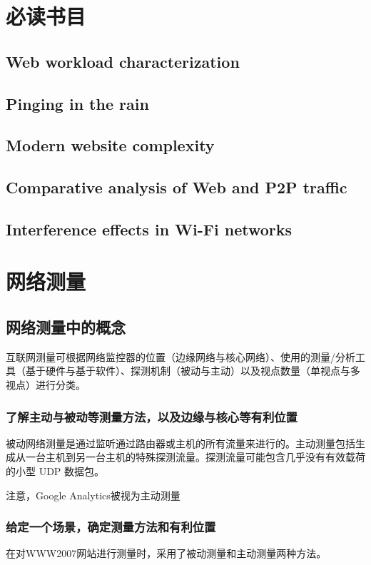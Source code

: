 \chapter*{必读书目}

\section{Web workload characterization}
\section{Pinging in the rain}
\section{Modern website complexity}
\section{Comparative analysis of Web and P2P traffic}
\section{Interference effects in Wi-Fi networks}


\chapter{网络测量}

\section{网络测量中的概念}

互联网测量可根据网络监控器的位置（边缘网络与核心网络）、使用的测量/分析工具（基于硬件与基于软件）、探测机制（被动与主动）以及视点数量（单视点与多视点）进行分类。

\subsection{了解主动与被动等测量方法，以及边缘与核心等有利位置}

被动网络测量是通过监听通过路由器或主机的所有流量来进行的。主动测量包括生成从一台主机到另一台主机的特殊探测流量。探测流量可能包含几乎没有有效载荷的小型 UDP 数据包。

注意，Google Analytics被视为主动测量

\subsection{给定一个场景，确定测量方法和有利位置}
在对WWW2007网站进行测量时，采用了被动测量和主动测量两种方法。

